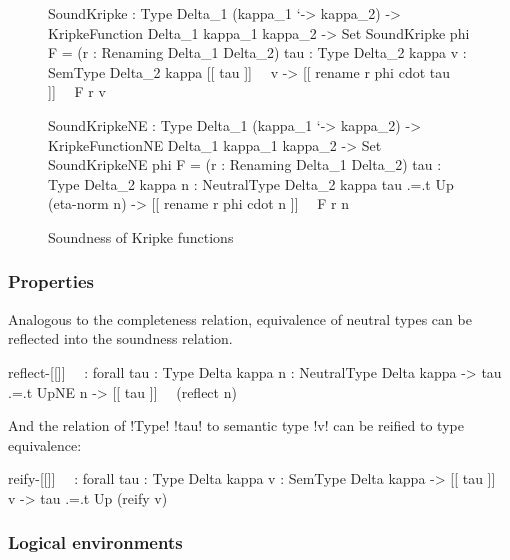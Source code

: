 \documentclass[sigplan,10pt,anonymous,review]{acmart}\settopmatter{printfolios=true,printccs=false,printacmref=false}
\begin{document}
\begin{figure}
\begin{agda}
SoundKripke : Type Delta_1 (kappa_1 `-> kappa_2) -> 
              KripkeFunction Delta_1  kappa_1  kappa_2 -> Set 
SoundKripke phi F = 
  (r : Renaming Delta_1  Delta_2) 
  {tau : Type Delta_2 kappa} {v : SemType Delta_2 kappa}
  [[ tau ]]~~ v -> 
  [[ rename r phi cdot tau ]]~~ F r v

SoundKripkeNE : Type Delta_1 (kappa_1 `-> kappa_2) -> 
                KripkeFunctionNE Delta_1  kappa_1  kappa_2 -> Set
SoundKripkeNE phi F = 
  (r : Renaming Delta_1  Delta_2) 
  {tau : Type Delta_2 kappa} {n : NeutralType Delta_2 kappa}
  tau .=.t Up (eta-norm n) -> 
  [[ rename r phi cdot n ]]~~ F r n
\end{agda}
\caption{Soundness of Kripke functions}
\label{fig:soundKripke}
\end{figure}
 
\subsubsection{Properties}

Analogous to the completeness relation, equivalence of neutral types can be reflected into the soundness relation.

\begin{agda}
reflect-[[]]~~ : forall {tau : Type Delta kappa} 
                 {n : NeutralType Delta kappa} -> 
                 tau .=.t UpNE n  -> [[ tau ]]~~ (reflect n)
\end{agda}

\Ni And the relation of !Type! !tau! to semantic type !v! can be reified to type equivalence: 

\begin{agda}
reify-[[]]~~ : forall {tau : Type Delta kappa}
               {v : SemType Delta kappa} -> 
               [[ tau ]]~~ v -> 
               tau .=.t Up (reify v)
\end{agda}



\subsubsection{Logical environments}
\end{document}
